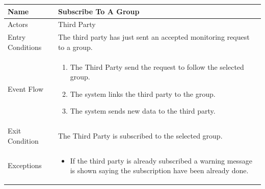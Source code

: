\begin{enumerate}
\FloatBarrier
\begin{table}[h]
\begin{tabular}{|l|p{}|}
\hline
Name             & Subscribe To A Group\\ \hline
Actors           & Third Party  \\ \hline
Entry Conditions & The third party has just sent an accepted monitoring request to a group. \\ \hline
Event Flow       & \begin{enumerate}
            \item The Third Party send the request to follow the selected group.
			\item The system links the third party to the group.
            \item The system sends new data to the third party.
        \end{enumerate}\\ \hline
Exit Condition   & The Third Party is subscribed to the selected group.\\ \hline
Exceptions       & \begin{itemize}
            \item If the third party is already subscribed a warning message is shown saying the subscription have been already done.
        \end{itemize}\\ \hline
\end{tabular}
\end{table}
\FloatBarrier


\end{enumerate}
